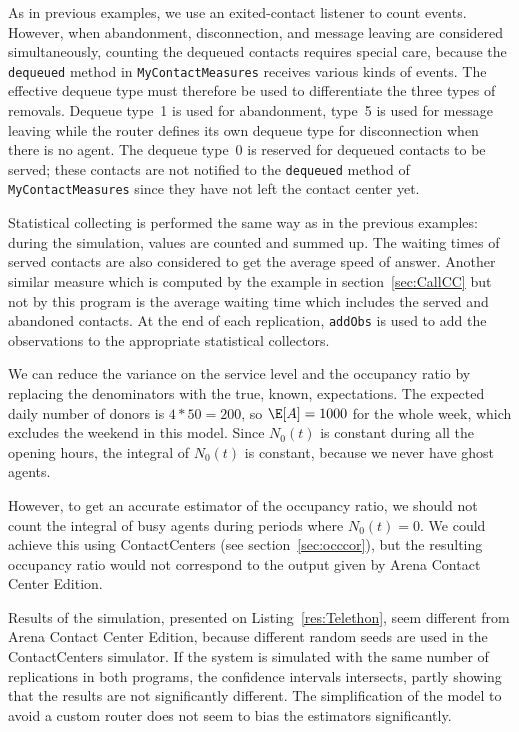 As in previous examples, we use an exited-contact listener to count
events.  However, when abandonment,
disconnection, and message leaving are considered simultaneously,
counting the dequeued contacts requires special care, because the
\texttt{dequeued}
method in \texttt{My\-Contact\-Measures} receives various kinds of
events.  The effective dequeue type must therefore be used to
differentiate the
three types of removals.  Dequeue type~1 is used for abandonment,
type~5 is used for message leaving while the router defines its own
dequeue type for disconnection when there is no agent.
The dequeue type~0 is reserved for dequeued contacts
to be served; these contacts are not notified to the \texttt{dequeued}
method of \texttt{My\-Contact\-Measures} since they have not left the contact
center yet.

Statistical collecting is performed the same way as in the
previous examples:  during the simulation, values
are counted and summed up.
The waiting times of served contacts are also considered to get the average
speed of answer.  Another similar measure which is computed by the example
in section~\ref{sec:CallCC} but not
by this
program is the average waiting time
which includes the served and abandoned contacts.  At the end of each
replication, \texttt{add\-Obs} is used to add the observations to the
appropriate statistical collectors.

We can reduce the variance on the service level and the occupancy
ratio by
replacing the denominators with the true, known, expectations.  The
expected daily number of donors is $4*50=200$, so $\E[A]=1000$ for the
whole week, which excludes the weekend in this model.  Since $N_0(t)$
is constant during all the opening hours,
the integral of $N_0(t)$ is constant, because we never have ghost
agents.

However, to get an accurate estimator of the occupancy ratio, we
should not count the integral of busy agents during periods where
$N_0(t)=0$.  We could achieve this using ContactCenters (see
section~\ref{sec:occcor}), but the
resulting occupancy ratio would not correspond to the output given by
Arena Contact Center Edition.

Results of the simulation, presented on Listing~\ref{res:Telethon},
seem different from Arena Contact
Center Edition, because different random seeds are used in the
ContactCenters simulator.  If the system is simulated with the same
number of
replications in both programs, the confidence intervals intersects, partly
showing that the results are not significantly different.
The simplification of the model to avoid a custom router does not seem
to bias the estimators significantly.

